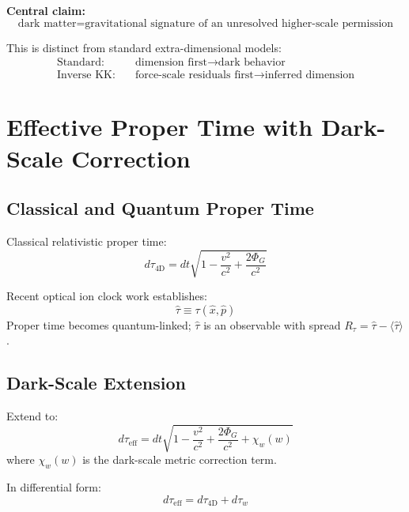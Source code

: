 \documentclass[11pt, a4paper, oneside]{article}
\theoremstyle{definition}
\theoremstyle{plain}
\theoremstyle{remark}
\begin{document}
\textbf{Central claim:}
\begin{equation}
  \boxed{
	\text{dark matter} = \text{gravitational signature of
	an unresolved higher-scale permission}
  }
\end{equation}

This is distinct from standard extra-dimensional models:
\begin{align*}
  \text{Standard:} &\quad \text{dimension first} \to \text{dark behavior} \\
  \text{Inverse KK:} &\quad \text{force-scale residuals first}
							  \to \text{inferred dimension}
\end{align*}

\section{Effective Proper Time with Dark-Scale Correction}

\subsection{Classical and Quantum Proper Time}

Classical relativistic proper time:
\begin{equation}
  d\tau_\text{4D}
  = dt\sqrt{1 - \frac{v^2}{c^2} + \frac{2\Phi_G}{c^2}}
  \label{eq:classical-proper-time}
\end{equation}

Recent optical ion clock work establishes:
\begin{equation}
  \hat{\tau} \equiv \tau(\hat{x}, \hat{p})
  \label{eq:quantum-proper-time}
\end{equation}
Proper time becomes quantum-linked; $\hat{\tau}$ is an observable with
spread $R_\tau = \hat{\tau} - \langle\hat{\tau}\rangle$.

\subsection{Dark-Scale Extension}

Extend to:
\begin{equation}
  \boxed{
	d\tau_\text{eff}
	= dt\sqrt{
		1 - \frac{v^2}{c^2}
		+ \frac{2\Phi_G}{c^2}
		+ \chi_w(w)
	  }
  }
  \label{eq:effective-proper-time}
\end{equation}
where $\chi_w(w)$ is the dark-scale metric correction term.

In differential form:
\begin{equation}
  d\tau_\text{eff} = d\tau_\text{4D} + d\tau_w
  \label{eq:tau-decomp}
\end{equation}
\end{document}
